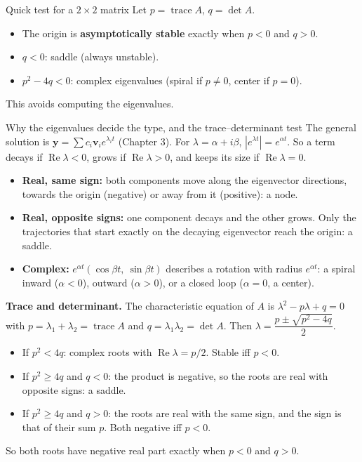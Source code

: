 \begin{methodbox}{Quick test for a $2\times2$ matrix}
Let $p = \operatorname{trace}A$, $q = \det A$.
\begin{itemize}
  \item The origin is \textbf{asymptotically stable} exactly when $p<0$ and $q>0$.
  \item $q<0$: saddle (always unstable).
  \item $p^2 - 4q < 0$: complex eigenvalues (spiral if $p\ne0$, center if $p=0$).
\end{itemize}
This avoids computing the eigenvalues.
\end{methodbox}

\begin{derivbox}{Why the eigenvalues decide the type, and the trace--determinant test}
The general solution is $\mathbf{y} = \sum c_i\mathbf{v}_ie^{\lambda_it}$ (Chapter 3). For $\lambda = \alpha + i\beta$, $|e^{\lambda t}| = e^{\alpha t}$. So a term decays if $\operatorname{Re}\lambda<0$, grows if $\operatorname{Re}\lambda>0$, and keeps its size if $\operatorname{Re}\lambda=0$.
\begin{itemize}
  \item \textbf{Real, same sign:} both components move along the eigenvector directions, towards the origin (negative) or away from it (positive): a node.
  \item \textbf{Real, opposite signs:} one component decays and the other grows. Only the trajectories that start exactly on the decaying eigenvector reach the origin: a saddle.
  \item \textbf{Complex:} $e^{\alpha t}(\cos\beta t,\ \sin\beta t)$ describes a rotation with radius $e^{\alpha t}$: a spiral inward ($\alpha<0$), outward ($\alpha>0$), or a closed loop ($\alpha=0$, a center).
\end{itemize}
\textbf{Trace and determinant.} The characteristic equation of $A$ is $\lambda^2 - p\lambda + q = 0$ with $p = \lambda_1+\lambda_2 = \operatorname{trace}A$ and $q = \lambda_1\lambda_2 = \det A$. Then $\lambda = \dfrac{p\pm\sqrt{p^2-4q}}{2}$.
\begin{itemize}
  \item If $p^2<4q$: complex roots with $\operatorname{Re}\lambda = p/2$. Stable iff $p<0$.
  \item If $p^2\ge4q$ and $q<0$: the product is negative, so the roots are real with opposite signs: a saddle.
  \item If $p^2\ge4q$ and $q>0$: the roots are real with the same sign, and the sign is that of their sum $p$. Both negative iff $p<0$.
\end{itemize}
So both roots have negative real part exactly when $p<0$ and $q>0$.
\end{derivbox}


